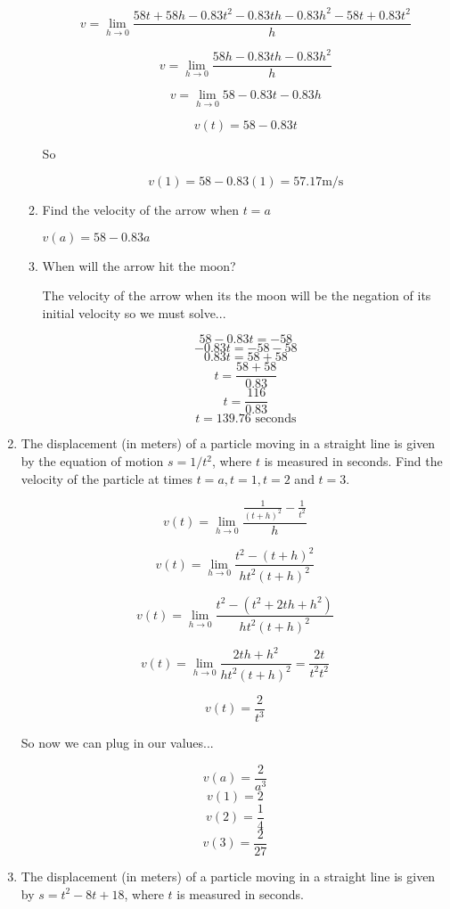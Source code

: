 \documentclass{article}
\begin{document}
\begin{enumerate}
\begin{enumerate}
				$$v = \lim \limits _{h \to 0} \frac{58t+58h-0.83t^2-0.83th-0.83h^2-58t+0.83t^2}{h}$$

				$$v = \lim \limits _{h \to 0} \frac{58h - 0.83th-0.83h^2}{h}$$

				$$v = \lim \limits _{h \to 0} 58 - 0.83t -0.83h$$

				$$v(t) = 58 - 0.83t$$

				So

				$$v(1) = 58 - 0.83(1) = 57.17 \text{m/s}$$

			\item Find the velocity of the arrow when $t=a$

				$v(a) = 58-0.83a$

			\item When will the arrow hit the moon?

				The velocity of the arrow when its the moon will be the negation of its initial
				velocity so we must solve...

				$$58 - 0.83t = -58$$ 
				$$-0.83t = -58 -58$$
				$$0.83t = 58+58$$
				$$t = \frac{58+58}{0.83}$$
				$$t = \frac{116}{0.83}$$
				$$t = 139.76 \text{ seconds}$$
		\end{enumerate}

		\item The displacement (in meters) of a particle moving in a straight line is given by the equation
			of motion $s = 1/t^2$, where $t$ is measured in seconds. Find the velocity of the particle at
			times $t=a,t=1,t=2$ and $t=3$.

			$$v(t) = \lim \limits _{h \to 0} \frac{ \frac{1}{(t + h)^2} - \frac{1}{t^2} }{h}$$

			$$v(t) = \lim \limits _{h \to 0} \frac{t^2 - (t+h)^2}{ht^2(t+h)^2}$$

			$$v(t) = \lim \limits _{h \to 0} \frac{t^2 - (t^2 + 2th + h^2)}{ht^2(t+h)^2}$$

			$$v(t) = \lim \limits _{h \to 0} \frac{2th+h^2}{ht^2(t+h)^2} = \frac{2t}{t^2t^2}$$

			$$v(t) = \frac{2}{t^3}$$

			So now we can plug in our values...

			$$v(a) = \frac{2}{a^3}$$
			$$v(1) = 2$$
			$$v(2) = \frac{1}{4}$$
			$$v(3) = \frac{2}{27}$$

		\item The displacement (in meters) of a particle moving in a straight line is given 
			by $s = t^2 - 8t + 18$, where $t$ is measured in seconds.


\end{enumerate}
\end{document}
